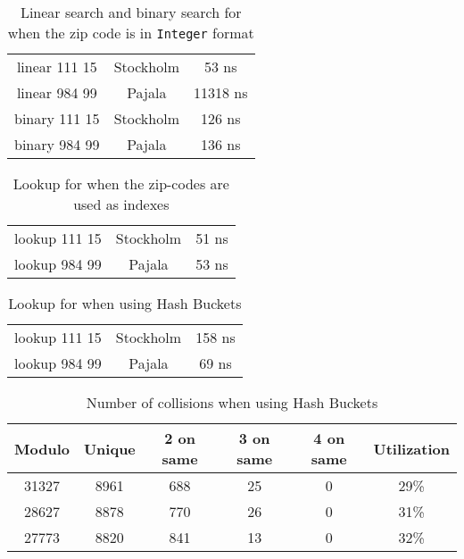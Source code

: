 \documentclass[a4paper,11pt]{article}
\begin{document}
\begin{table}[h!]
    \begin{center}
        \caption{Linear search and binary search for when the zip code is in {\tt Integer} format}
        \label{tab:IntegerZip}
        \begin{tabular}{|c|c|c|}
            \hline
            linear 111 15 & Stockholm & 53 ns    \\
            linear 984 99 & Pajala    & 11318 ns \\
            binary 111 15 & Stockholm & 126 ns   \\
            binary 984 99 & Pajala    & 136 ns   \\
            \hline
        \end{tabular}
    \end{center}
\end{table}
\begin{table}[h!]
    \begin{center}
        \caption{Lookup for when the zip-codes are used as indexes}
        \label{tab:ZipIndexes}
        \begin{tabular}{|c|c|c|}
            \hline
            lookup 111 15 & Stockholm & 51 ns \\
            lookup 984 99 & Pajala    & 53 ns \\
            \hline
        \end{tabular}
    \end{center}
\end{table}
\begin{table}[h!]
    \begin{center}
        \caption{Lookup for when using Hash Buckets}
        \label{tab:BucketTime}
        \begin{tabular}{|c|c|c|}
            \hline
            lookup 111 15 & Stockholm & 158 ns \\
            lookup 984 99 & Pajala    & 69 ns  \\
            \hline
        \end{tabular}
    \end{center}
\end{table}
\begin{table}[h!]
    \begin{center}
        \caption{Number of collisions when using Hash Buckets}
        \label{tab:BucketCollisions}
        \begin{tabular}{|c|c|c|c|c|c|}
            \hline
            Modulo & Unique & 2 on same & 3 on same & 4 on same & Utilization \\
            \hline
            31327  & 8961   & 688       & 25        & 0         & 29\%        \\
            28627  & 8878   & 770       & 26        & 0         & 31\%        \\
            27773  & 8820   & 841       & 13        & 0         & 32\%        \\
            \hline
        \end{tabular}
    \end{center}
\end{table}
\end{document}
